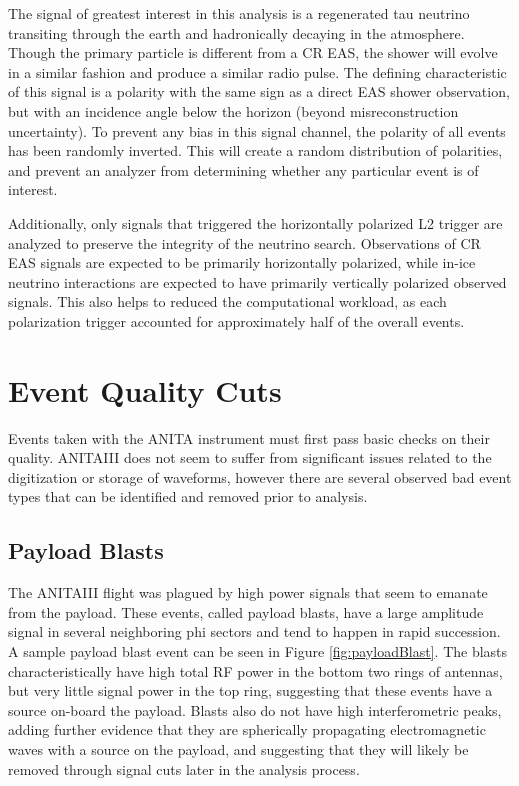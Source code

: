 		The signal of greatest interest in this analysis is a regenerated tau neutrino transiting through the earth and hadronically decaying in the atmosphere.  Though the primary particle is different from a CR EAS, the shower will evolve in a similar fashion and produce a similar radio pulse.  The defining characteristic of this signal is a polarity with the same sign as a direct EAS shower observation, but with an incidence angle below the horizon (beyond misreconstruction uncertainty).  To prevent any bias in this signal channel, the polarity of all events has been randomly inverted.  This will create a random distribution of polarities, and prevent an analyzer from determining whether any particular event is of interest.
		
		Additionally, only signals that triggered the horizontally polarized L2 trigger are analyzed to preserve the integrity of the neutrino search.  Observations of CR EAS signals are expected to be primarily horizontally polarized, while in-ice neutrino interactions are expected to have primarily vertically polarized observed signals.  This also helps to reduced the computational workload, as each polarization trigger accounted for approximately half of the overall events.
		
			
\section{Event Quality Cuts}
	Events taken with the ANITA instrument must first pass basic checks on their quality.  ANITAIII does not seem to suffer from significant issues related to the digitization or storage of waveforms, however there are several observed bad event types that can be identified and removed prior to analysis.

	\subsection{Payload Blasts}
		The ANITAIII flight was plagued by high power signals that seem to emanate from the payload.  These events, called payload blasts, have a large amplitude signal in several neighboring phi sectors and tend to happen in rapid succession.  A sample payload blast event can be seen in Figure \ref{fig:payloadBlast}.  The blasts characteristically have high total RF power in the bottom two rings of antennas, but very little signal power in the top ring, suggesting that these events have a source on-board the payload.  Blasts also do not have high interferometric peaks, adding further evidence that they are spherically propagating electromagnetic waves with a source on the payload, and suggesting that they will likely be removed through signal cuts later in the analysis process.
		
